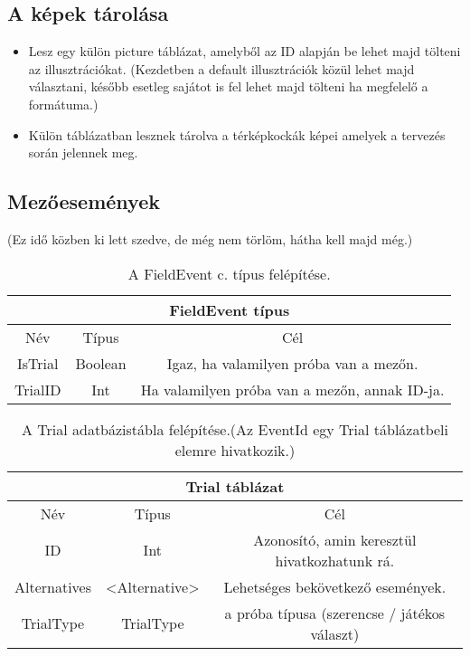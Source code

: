 \subsection{A képek tárolása}

\begin{itemize}
	\item Lesz egy külön picture táblázat, amelyből az ID alapján be lehet majd tölteni az illusztrációkat. (Kezdetben a default illusztrációk közül lehet majd választani, később esetleg sajátot is fel lehet majd tölteni ha megfelelő a formátuma.)
	
	\item Külön táblázatban lesznek tárolva a térképkockák képei amelyek a tervezés során jelennek meg.
\end{itemize}

\subsection{Mezőesemények}

(Ez idő közben ki lett szedve, de még nem törlöm, hátha kell majd még.)
\begin{table}[H]
	\centering
	\begin{tabular}{ |c|c|c| }
		\hline
		\multicolumn{3}{|c|}{FieldEvent típus}\\
		\hline
		Név & Típus & Cél \\
		\hline
		IsTrial  & Boolean  & Igaz, ha valamilyen próba van a mezőn.\\
		\hline
		TrialID & Int & Ha valamilyen próba van a mezőn, annak ID-ja.\\
		\hline
	\end{tabular}
	\caption[FieldEvent típus]{A FieldEvent c. típus felépítése.}
	\label{tab:field}
\end{table}


\begin{table}[htb]
	\centering
	\begin{tabular}{ |c|c|c| }
		\hline
		\multicolumn{3}{|c|}{Trial táblázat}\\
		\hline
		Név & Típus & Cél \\
		\hline
		ID & Int & Azonosító, amin keresztül hivatkozhatunk rá. \\
		\hline
		Alternatives & <Alternative> & Lehetséges bekövetkező események.\\
		\hline
		TrialType & TrialType & a próba típusa (szerencse / játékos választ)\\
		\hline
	\end{tabular}
	\caption[Trial adatbázistába]{A Trial adatbázistábla felépítése.(Az EventId egy Trial táblázatbeli elemre hivatkozik.)}
	\label{tab:trial}
\end{table}

